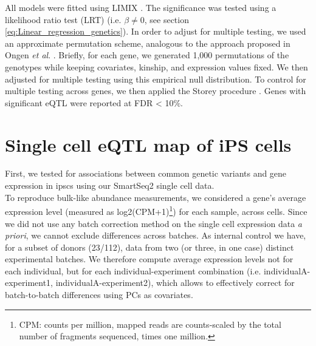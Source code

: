 All models were fitted using LIMIX \cite{lippert2014limix, casale2015efficient}. 
The significance was tested using a likelihood ratio test (LRT) (i.e. $\beta \neq 0$, see section \ref{eq:Linear_regression_genetics}).
In order to adjust for multiple testing, we used an approximate permutation scheme, analogous to the approach proposed in Ongen \textit{et al}. \cite{ongen2016fast}. 
Briefly, for each gene, we generated 1,000 permutations of the genotypes while keeping covariates, kinship, and expression values fixed. 
We then adjusted for multiple testing using this empirical null distribution. 
To control for multiple testing across genes, we then applied the Storey procedure \cite{storey2003statistical}. 
Genes with significant eQTL were reported at FDR < 10\%.

\newpage

\section{Single cell eQTL map of iPS cells}

First, we tested for associations between common genetic variants and gene expression in \glspl{ipsc} using our SmartSeq2 single cell data.\\

To reproduce bulk-like abundance measurements, we considered a gene's average expression level (measured as log2(CPM+1)\footnote{CPM: counts per million, mapped reads are counts-scaled by the total number of fragments sequenced, times one million.}) for each sample, across cells.
Since we did not use any batch correction method on the single cell expression data \textit{a priori}, we cannot exclude differences across batches.
As internal control we have, for a subset of donors (23/112), data from two (or three, in one case) distinct experimental batches.
We therefore compute average expression levels not for each individual, but for each individual-experiment combination (i.e. individualA-experiment1, individualA-experiment2), which allows to effectively correct for batch-to-batch differences using PCs as covariates.\\


